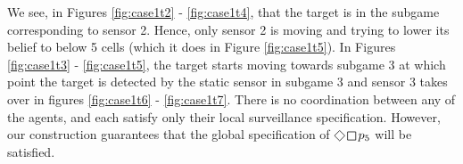  We see, in Figures \ref{fig:case1t2} - \ref{fig:case1t4}, that the target is in the subgame corresponding to sensor 2. Hence, only sensor 2 is moving and trying to lower its belief to below 5 cells (which it does in Figure \ref{fig:case1t5}). In Figures \ref{fig:case1t3} - \ref{fig:case1t5}, the target starts moving towards subgame 3 at which point the target is detected by the static sensor in subgame 3 and sensor 3 takes over in figures \ref{fig:case1t6} - \ref{fig:case1t7}. There is no coordination between any of the agents, and each satisfy only their local surveillance specification. However, our construction guarantees that the global specification of $\LTLfinally \LTLglobally p_5$ will be satisfied. %
 
